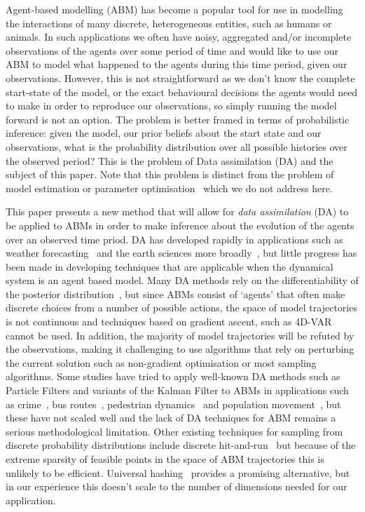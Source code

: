 \documentclass{article}
\begin{document}
Agent-based modelling (ABM) has become a popular tool for use in modelling the interactions of many discrete, heterogeneous entities, such as humans or animals. In such applications we often have noisy, aggregated and/or incomplete observations of the agents over some period of time and would like to use our ABM to model what happened to the agents during this time period, given our observations. However, this is not straightforward as we don't know the complete start-state of the model, or the exact behavioural decisions the agents would need to make in order to reproduce our observations, so simply running the model forward is not an option. The problem is better framed in terms of probabilistic inference: given the model, our prior beliefs about the start state and our observations, what is the probability distribution over all possible histories over the observed period? This is the problem of Data assimilation (DA) and the subject of this paper. Note that this problem is distinct from the problem of model estimation or parameter optimisation~\cite{thiele_facilitating_2014} which we do not address here.

This paper presents a new method that will allow for \textit{data assimilation} (DA) to be applied to ABMs in order to make inference about the evolution of the agents over an observed time priod. DA has developed rapidly in applications such as weather forecasting~\cite{kalnay_atmospheric_2003} and the earth sciences more broadly~\cite{reichle_data_2008}, but little progress has been made in developing techniques that are applicable when the dynamical system is an agent based model. Many DA methods rely on the differentiability of the posterior distribution~\cite{lewis_dynamic_2006}, but since ABMs consist of `agents' that often make discrete choices from a number of possible actions, the space of model trajectories is not continuous and techniques based on gradient ascent, such as 4D-VAR~\cite{talagrand_assimilation_1997} cannot be used. 
In addition, the majority of model trajectories will be refuted by the observations, making it challenging to use algorithms that rely on perturbing the current solution such as non-gradient optimisation or most sampling algorithms. Some studies have tried to apply well-known DA methods such as Particle Filters and variants of the Kalman Filter to ABMs in applications such as crime~\cite{lloyd_exploring_2016}, bus routes~\cite{kieu_dealing_2020}, pedestrian dynamics~\cite{wang_data_2015, ward_dynamic_2016, clay_realtime_2020, malleson_simulating_2020} and population movement~\cite{lueck_who_2019}, but these have not scaled well and the lack of DA techniques for ABM remains a serious methodological limitation. Other existing techniques for sampling from discrete probability distributions include discrete hit-and-run~\cite{baumert2009discrete} but because of the extreme sparsity of feasible points in the space of ABM trajectories this is unlikely to be efficient. Universal hashing~\cite{meel2016constrained} provides a promising alternative, but in our experience this doesn't scale to the number of dimensions needed for our application. 
\end{document}
